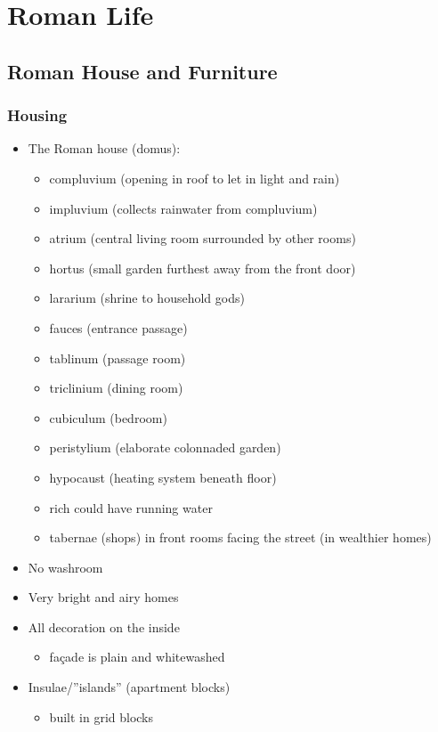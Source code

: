\documentclass[12pt, twoside]{article}
\begin{document}
\section{Roman Life}
\subsection{Roman House and Furniture}
\subsubsection{Housing}
\begin{itemize}
\item The Roman house (domus):
	\begin{itemize}
	\item compluvium (opening in roof to let in light and rain)
	\item impluvium (collects rainwater from compluvium)
	\item atrium (central living room surrounded by other rooms)
	\item hortus (small garden furthest away from the front door)
	\item lararium (shrine to household gods)
	\item fauces (entrance passage)
	\item tablinum (passage room)
	\item triclinium (dining room)
	\item cubiculum (bedroom)
	\item peristylium (elaborate colonnaded garden)
	\item hypocaust (heating system beneath floor)
	\item rich could have running water
	\item tabernae (shops) in front rooms facing the street (in wealthier homes)
	\end{itemize}
\item No washroom
\item Very bright and airy homes
\item All decoration on the inside
	\begin{itemize}
	\item façade is plain and whitewashed
	\end{itemize}
\item Insulae/”islands” (apartment blocks) 
	\begin{itemize}
	\item built in grid blocks
	\end{itemize}

\end{itemize}
\end{document}
